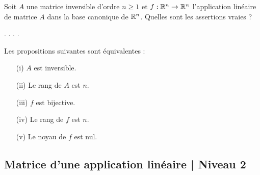 \begin{question}
Soit $A$ une matrice inversible d'ordre $n\ge 1$  et $f:\mathbb{R}^n \to \mathbb{R}^n$ l'application linéaire de matrice $A$ dans la base canonique de $\mathbb{R}^n$. Quelles sont les assertions vraies ?
\begin{answers} 
.
.
.
.
\end{answers}
\begin{explanations} Les propositions suivantes sont équivalentes :
\begin{enumerate}
\item[(i)] $A$ est inversible.
\item[(ii)] Le rang de $A$ est $n$.
\item[(iii)] $f$ est bijective.
\item[(iv)] Le rang de $f$ est $n$.
\item[(v)] Le noyau de $f$ est nul.
\end{enumerate}
\end{explanations}
\end{question}

\subsection{Matrice d'une application linéaire | Niveau 2}



